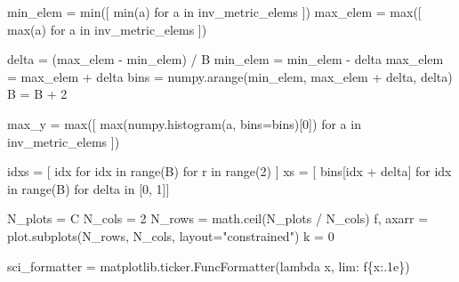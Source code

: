 \documentclass[
  letterpaper,
  DIV=11,
  numbers=noendperiod]{scrartcl}
\newenvironment{Shaded}{\begin{snugshade}}{\end{snugshade}}
\newcommand{\BuiltInTok}[1]{\textcolor[rgb]{0.00,0.23,0.31}{#1}}
\newcommand{\ControlFlowTok}[1]{\textcolor[rgb]{0.00,0.23,0.31}{#1}}
\newcommand{\DecValTok}[1]{\textcolor[rgb]{0.68,0.00,0.00}{#1}}
\newcommand{\KeywordTok}[1]{\textcolor[rgb]{0.00,0.23,0.31}{#1}}
\newcommand{\NormalTok}[1]{\textcolor[rgb]{0.00,0.23,0.31}{#1}}
\newcommand{\OperatorTok}[1]{\textcolor[rgb]{0.37,0.37,0.37}{#1}}
\newcommand{\SpecialCharTok}[1]{\textcolor[rgb]{0.37,0.37,0.37}{#1}}
\newcommand{\SpecialStringTok}[1]{\textcolor[rgb]{0.13,0.47,0.30}{#1}}
\newcommand{\StringTok}[1]{\textcolor[rgb]{0.13,0.47,0.30}{#1}}
\begin{document}
\begin{Shaded}
\begin{Highlighting}[]
\NormalTok{  min\_elem }\OperatorTok{=} \BuiltInTok{min}\NormalTok{([ }\BuiltInTok{min}\NormalTok{(a) }\ControlFlowTok{for}\NormalTok{ a }\KeywordTok{in}\NormalTok{ inv\_metric\_elems ])}
\NormalTok{  max\_elem }\OperatorTok{=} \BuiltInTok{max}\NormalTok{([ }\BuiltInTok{max}\NormalTok{(a) }\ControlFlowTok{for}\NormalTok{ a }\KeywordTok{in}\NormalTok{ inv\_metric\_elems ])}
  
\NormalTok{  delta }\OperatorTok{=}\NormalTok{ (max\_elem }\OperatorTok{{-}}\NormalTok{ min\_elem) }\OperatorTok{/}\NormalTok{ B}
\NormalTok{  min\_elem }\OperatorTok{=}\NormalTok{ min\_elem }\OperatorTok{{-}}\NormalTok{ delta}
\NormalTok{  max\_elem }\OperatorTok{=}\NormalTok{ max\_elem }\OperatorTok{+}\NormalTok{ delta}
\NormalTok{  bins }\OperatorTok{=}\NormalTok{ numpy.arange(min\_elem, max\_elem }\OperatorTok{+}\NormalTok{ delta, delta)}
\NormalTok{  B }\OperatorTok{=}\NormalTok{ B }\OperatorTok{+} \DecValTok{2}
  
\NormalTok{  max\_y }\OperatorTok{=} \BuiltInTok{max}\NormalTok{([ }\BuiltInTok{max}\NormalTok{(numpy.histogram(a, bins}\OperatorTok{=}\NormalTok{bins)[}\DecValTok{0}\NormalTok{])}
                \ControlFlowTok{for}\NormalTok{ a }\KeywordTok{in}\NormalTok{ inv\_metric\_elems ])}
  
\NormalTok{  idxs }\OperatorTok{=}\NormalTok{ [ idx }\ControlFlowTok{for}\NormalTok{ idx }\KeywordTok{in} \BuiltInTok{range}\NormalTok{(B) }\ControlFlowTok{for}\NormalTok{ r }\KeywordTok{in} \BuiltInTok{range}\NormalTok{(}\DecValTok{2}\NormalTok{) ]}
\NormalTok{  xs }\OperatorTok{=}\NormalTok{ [ bins[idx }\OperatorTok{+}\NormalTok{ delta] }\ControlFlowTok{for}\NormalTok{ idx }\KeywordTok{in} \BuiltInTok{range}\NormalTok{(B) }\ControlFlowTok{for}\NormalTok{ delta }\KeywordTok{in}\NormalTok{ [}\DecValTok{0}\NormalTok{, }\DecValTok{1}\NormalTok{]]}
  
\NormalTok{  N\_plots }\OperatorTok{=}\NormalTok{ C}
\NormalTok{  N\_cols }\OperatorTok{=} \DecValTok{2}
\NormalTok{  N\_rows }\OperatorTok{=}\NormalTok{ math.ceil(N\_plots }\OperatorTok{/}\NormalTok{ N\_cols)}
\NormalTok{  f, axarr }\OperatorTok{=}\NormalTok{ plot.subplots(N\_rows, N\_cols, layout}\OperatorTok{=}\StringTok{"constrained"}\NormalTok{)}
\NormalTok{  k }\OperatorTok{=} \DecValTok{0}
  
\NormalTok{  sci\_formatter }\OperatorTok{=}\NormalTok{ matplotlib.ticker.FuncFormatter(}\KeywordTok{lambda}\NormalTok{ x,}
\NormalTok{                                                  lim: }\SpecialStringTok{f\textquotesingle{}}\SpecialCharTok{\{}\NormalTok{x}\SpecialCharTok{:.1e\}}\SpecialStringTok{\textquotesingle{}}\NormalTok{)}
  

\end{Highlighting}
\end{Shaded}
\end{document}
